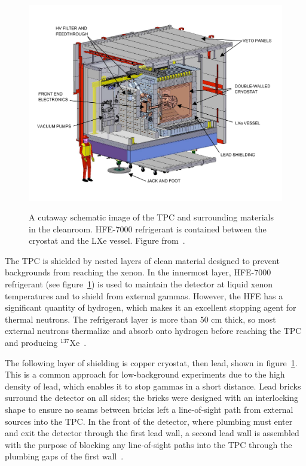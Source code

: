 \begin{figure}
\begin{center}
\includegraphics[keepaspectratio=true,width=\textwidth]{cleanroom.pdf}
\end{center}
\renewcommand{\baselinestretch}{1}
\small\normalsize
\begin{quote}
\caption{A cutaway schematic image of the TPC and surrounding materials in the cleanroom.  HFE-7000 refrigerant is contained between the cryostat and the LXe vessel.  Figure from~\cite{detectorPartI}.}
\label{fig:CleanRoomCutaway}
\end{quote}
\end{figure}
\renewcommand{\baselinestretch}{2}
\small\normalsize

The TPC is shielded by nested layers of clean material designed to prevent backgrounds from reaching the xenon.  In the innermost layer, HFE-7000 refrigerant (see figure~\ref{fig:CleanRoomCutaway}) is used to maintain the detector at liquid xenon temperatures and to shield from external gammas.  However, the HFE has a significant quantity of hydrogen, which makes it an excellent stopping agent for thermal neutrons.  The refrigerant layer is more than $50$ cm thick, so most external neutrons thermalize and absorb onto hydrogen before reaching the TPC and producing $^{137}$Xe~\cite{detectorPartI}.

The following layer of shielding is copper cryostat, then lead, shown in figure~\ref{fig:CleanRoomCutaway}.  This is a common approach for low-background experiments due to the high density of lead, which enables it to stop gammas in a short distance.  Lead bricks surround the detector on all sides; the bricks were designed with an interlocking shape to ensure no seams between bricks left a line-of-sight path from external sources into the TPC.  In the front of the detector, where plumbing must enter and exit the detector through the first lead wall, a second lead wall is assembled with the purpose of blocking any line-of-sight paths into the TPC through the plumbing gaps of the first wall~\cite{detectorPartI}.

